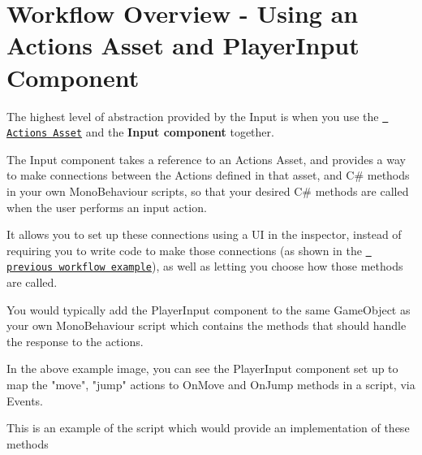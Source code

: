 \chapter{Workflow Overview -\/ Using an Actions Asset and Player\+Input Component}
\hypertarget{md__hey_tea_9_2_library_2_package_cache_2com_8unity_8inputsystem_0d1_86_83_2_documentation_0i_2_workflow-_player_input}{}\label{md__hey_tea_9_2_library_2_package_cache_2com_8unity_8inputsystem_0d1_86_83_2_documentation_0i_2_workflow-_player_input}
\label{md__hey_tea_9_2_library_2_package_cache_2com_8unity_8inputsystem_0d1_86_83_2_documentation_0i_2_workflow-_player_input_autotoc_md1611}%
%
 

The highest level of abstraction provided by the Input  is when you use the \href{ActionAssets.html}{\texttt{ Actions Asset}} and the {\bfseries{ Input component}} together.

The  Input component takes a reference to an Actions Asset, and provides a way to make connections between the Actions defined in that asset, and C\# methods in your own Mono\+Behaviour scripts, so that your desired C\# methods are called when the user performs an input action.

It allows you to set up these connections using a UI in the inspector, instead of requiring you to write code to make those connections (as shown in the \href{Workflow-ActionsAsset.html}{\texttt{ previous workflow example}}), as well as letting you choose how those methods are called.

You would typically add the Player\+Input component to the same Game\+Object as your own Mono\+Behaviour script which contains the methods that should handle the response to the actions.



In the above example image, you can see the Player\+Input component set up to map the "{}move"{}, "{}jump"{} actions to {\ttfamily On\+Move} and {\ttfamily On\+Jump} methods in a script, via  Events.

This is an example of the script which would provide an implementation of these methods


